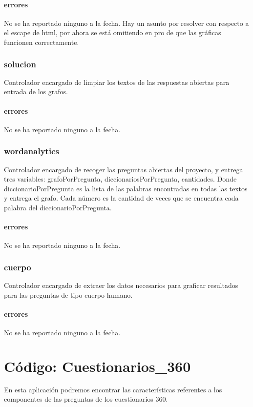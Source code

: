 \documentclass[10pt,a4paper]{book}
\begin{document}
	\subsubsection{errores}
	No se ha reportado ninguno a la fecha. Hay un asunto por resolver con respecto a el escape de html, por ahora se está omitiendo en pro de que las gráficas funcionen correctamente. 
	
	\subsection{solucion}
	Controlador encargado de limpiar los textos de las respuestas abiertas para entrada de los grafos.
	\subsubsection{errores}
	No se ha reportado ninguno a la fecha.
	
	\subsection{wordanalytics}
	Controlador encargado de recoger las preguntas abiertas del proyecto, y entrega tres variables: grafoPorPregunta, diccionariosPorPregunta, cantidades. Donde diccionarioPorPregunta es la lista de las palabras encontradas en todas las textos y entrega el grafo. Cada número es la cantidad de veces que se encuentra cada palabra del diccionarioPorPregunta.
	\subsubsection{errores}
	No se ha reportado ninguno a la fecha.
	
	\subsection{cuerpo}
	Controlador encargado de extraer los datos necesarios para graficar resultados para las preguntas de tipo cuerpo humano. 
	\subsubsection{errores}
	No se ha reportado ninguno a la fecha.


	\chapter{Código: Cuestionarios\_360}
	
	En esta aplicación podremos encontrar las características referentes a los componentes de las preguntas de los cuestionarios 360.
	
\end{document}
